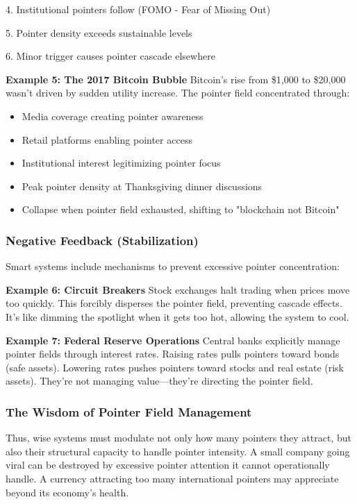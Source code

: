 \documentclass[11pt,oneside]{book}
\begin{document}
4. Institutional pointers follow (FOMO - Fear of Missing Out)


5. Pointer density exceeds sustainable levels


6. Minor trigger causes pointer cascade elsewhere


\textbf{Example 5: The 2017 Bitcoin Bubble}
Bitcoin's rise from \$1,000 to \$20,000 wasn't driven by sudden utility increase. The pointer field concentrated through:
\begin{itemize}
\item Media coverage creating pointer awareness
\item Retail platforms enabling pointer access
\item Institutional interest legitimizing pointer focus
\item Peak pointer density at Thanksgiving dinner discussions
\item Collapse when pointer field exhausted, shifting to "blockchain not Bitcoin"
\end{itemize}

\subsubsection{Negative Feedback (Stabilization)}
Smart systems include mechanisms to prevent excessive pointer concentration:

\textbf{Example 6: Circuit Breakers}
Stock exchanges halt trading when prices move too quickly. This forcibly disperses the pointer field, preventing cascade effects. It's like dimming the spotlight when it gets too hot, allowing the system to cool.

\textbf{Example 7: Federal Reserve Operations}
Central banks explicitly manage pointer fields through interest rates. Raising rates pulls pointers toward bonds (safe assets). Lowering rates pushes pointers toward stocks and real estate (risk assets). They're not managing value—they're directing the pointer field.

\subsubsection{The Wisdom of Pointer Field Management}

Thus, wise systems must modulate not only how many pointers they attract, but also their structural capacity to handle pointer intensity. A small company going viral can be destroyed by excessive pointer attention it cannot operationally handle. A currency attracting too many international pointers may appreciate beyond its economy's health.
\end{document}
